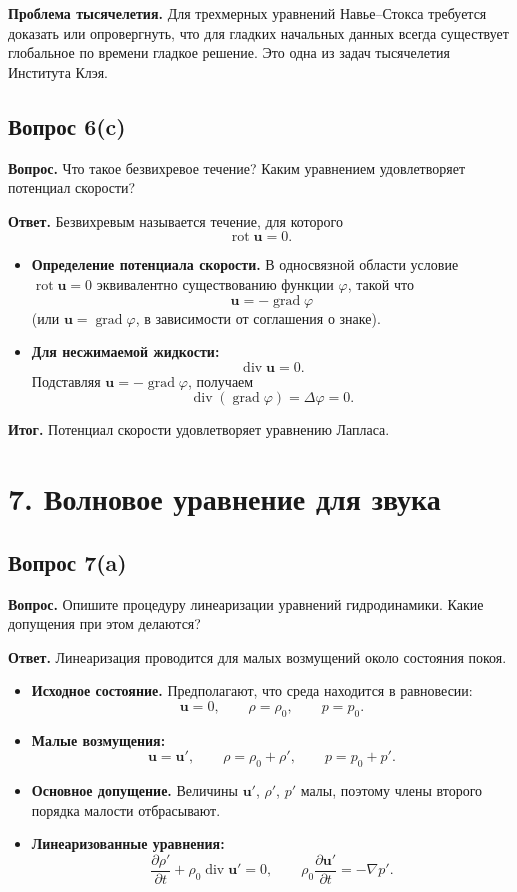\documentclass[a4paper,12pt]{article}
\newcommand{\grad}{\operatorname{grad}}
\newcommand{\diver}{\operatorname{div}}
\newcommand{\rot}{\operatorname{rot}}
\newcommand{\Question}[2]{\subsection*{Вопрос #1}\textbf{Вопрос.} #2}
\newcommand{\Answer}{\textbf{Ответ.}}
\begin{document}
\textbf{Проблема тысячелетия.} Для трехмерных уравнений Навье--Стокса требуется доказать или опровергнуть, что для гладких начальных данных всегда существует глобальное по времени гладкое решение. Это одна из задач тысячелетия Института Клэя.

\Question{6(c)}{Что такое безвихревое течение? Каким уравнением удовлетворяет потенциал скорости?}

\Answer
Безвихревым называется течение, для которого
\[
\rot\mathbf{u}=0.
\]

\begin{itemize}
  \item \textbf{Определение потенциала скорости.} В односвязной области условие $\rot\mathbf{u}=0$ эквивалентно существованию функции $\varphi$, такой что
  \[
  \mathbf{u}=-\grad\varphi
  \]
  (или $\mathbf{u}=\grad\varphi$, в зависимости от соглашения о знаке).

  \item \textbf{Для несжимаемой жидкости:}
  \[
  \diver\mathbf{u}=0.
  \]
  Подставляя $\mathbf{u}=-\grad\varphi$, получаем
  \[
  \diver(\grad\varphi)=\Delta\varphi=0.
  \]
\end{itemize}

\textbf{Итог.} Потенциал скорости удовлетворяет уравнению Лапласа.

\section*{7. Волновое уравнение для звука}

\Question{7(a)}{Опишите процедуру линеаризации уравнений гидродинамики. Какие допущения при этом делаются?}

\Answer
Линеаризация проводится для малых возмущений около состояния покоя.

\begin{itemize}
  \item \textbf{Исходное состояние.} Предполагают, что среда находится в равновесии:
  \[
  \mathbf{u}=0, \qquad \rho=\rho_0, \qquad p=p_0.
  \]

  \item \textbf{Малые возмущения:}
  \[
  \mathbf{u}=\mathbf{u}', \qquad
  \rho=\rho_0+\rho', \qquad
  p=p_0+p'.
  \]

  \item \textbf{Основное допущение.} Величины $\mathbf{u}'$, $\rho'$, $p'$ малы, поэтому члены второго порядка малости отбрасывают.

  \item \textbf{Линеаризованные уравнения:}
  \[
  \frac{\partial \rho'}{\partial t}+\rho_0\diver\mathbf{u}'=0,
  \qquad
  \rho_0\frac{\partial \mathbf{u}'}{\partial t}=-\nabla p'.
  \]
\end{itemize}
\end{document}

